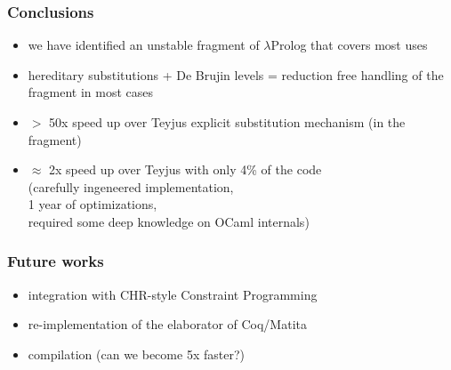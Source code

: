 \documentclass{beamer}
\begin{document}
\begin{frame}
 \frametitle{Conclusions}
 \begin{itemize}
  \item we have identified an unstable fragment of $\lambda$Prolog that
   covers most uses
  \item hereditary substitutions + De Brujin levels = reduction free handling
   of the fragment in most cases
  \item $>$ 50x speed up over Teyjus explicit substitution mechanism (in the fragment)
  \item $\approx$ 2x speed up over Teyjus with only 4\% of the code\\
    (carefully ingeneered implementation,\\
     1 year of optimizations,\\
     required some deep knowledge on OCaml internals)
 \end{itemize}
\end{frame}

\begin{frame}
 \frametitle{Future works}
 \begin{itemize}
  \item integration with CHR-style Constraint Programming
  \item re-implementation of the elaborator of Coq/Matita
  \item compilation (can we become 5x faster?)
 \end{itemize}
\end{frame}
\end{document}

